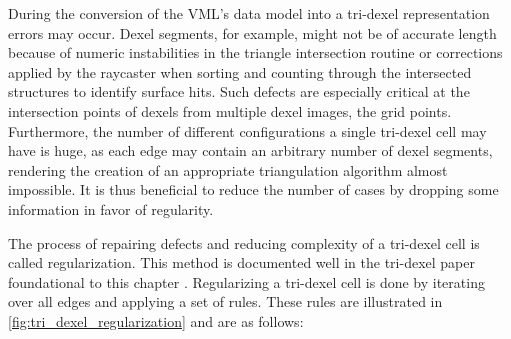 During the conversion of the VML's data model into a tri-dexel representation errors may occur.
Dexel segments, for example, might not be of accurate length because of numeric instabilities in the triangle intersection routine or corrections applied by the raycaster when sorting and counting through the intersected structures to identify surface hits.
Such defects are especially critical at the intersection points of dexels from multiple dexel images, the grid points.
Furthermore, the number of different configurations a single tri-dexel cell may have is huge, as each edge may contain an arbitrary number of dexel segments, rendering the creation of an appropriate triangulation algorithm almost impossible.
It is thus beneficial to reduce the number of cases by dropping some information in favor of regularity.

The process of repairing defects and reducing complexity of a tri-dexel cell is called regularization.
This method is documented well in the tri-dexel paper foundational to this chapter \cite{tridexel_reconstruction}.
Regularizing a tri-dexel cell is done by iterating over all edges and applying a set of rules.
These rules are illustrated in \cref{fig:tri_dexel_regularization} and are as follows:

